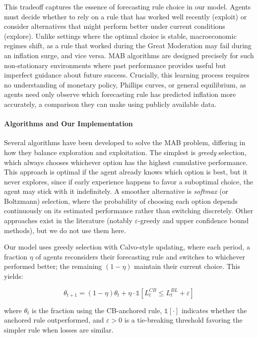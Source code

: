 \documentclass[10pt]{article}
\begin{document}
This tradeoff captures the essence of forecasting rule choice in our model. Agents must decide whether to rely on a rule that has worked well recently (exploit) or consider alternatives that might perform better under current conditions (explore). Unlike settings where the optimal choice is stable, macroeconomic regimes shift, as a rule that worked during the Great Moderation may fail during an inflation surge, and vice versa. MAB algorithms are designed precisely for such non-stationary environments where past performance provides useful but imperfect guidance about future success. Crucially, this learning process requires no understanding of monetary policy, Phillips curves, or general equilibrium, as agents need only observe which forecasting rule has predicted inflation more accurately, a comparison they can make using publicly available data.

\paragraph{Algorithms and Our Implementation} Several algorithms have been developed to solve the MAB problem, differing in how they balance exploration and exploitation. The simplest is \textit{greedy} selection, which always chooses whichever option has the highest cumulative performance. This approach is optimal if the agent already knows which option is best, but it never explores, since if early experience happens to favor a suboptimal choice, the agent may stick with it indefinitely. A smoother alternative is \textit{softmax} (or Boltzmann) selection, where the probability of choosing each option depends continuously on its estimated performance rather than switching discretely. Other approaches exist in the literature (notably $\varepsilon$-greedy and upper confidence bound methods), but we do not use them here.

Our model uses greedy selection with Calvo-style updating, where each period, a fraction $\eta$ of agents reconsiders their forecasting rule and switches to whichever performed better; the remaining $(1-\eta)$ maintain their current choice. This yields:
  
\begin{equation}
\theta_{t+1} = (1-\eta)\theta_t + \eta \cdot \mathds{1}[L^{CB}_t \leq L^{BL}_t + \varepsilon]
\end{equation}

where $\theta_t$ is the fraction using the CB-anchored rule, $\mathds{1}[\cdot]$ indicates whether the anchored rule outperformed, and $\varepsilon > 0$ is a tie-breaking threshold favoring the simpler rule when losses are similar.
\end{document}
